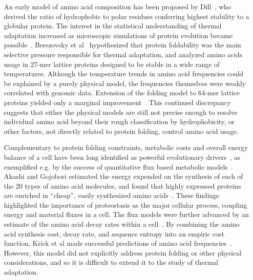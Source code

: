 \documentclass[10pt,letterpaper]{article}
\begin{document}
An early model of amino acid composition has been proposed by Dill~\cite{Dill1985Theory}, who derived the ratio of hydrophobic to polar residues conferring highest stability to a globular protein. The interest in the statistical understanding of thermal adaptation increased as microscopic simulations of protein evolution became possible~\cite{Taverna2002Why,Bloom2006Protein,Goldstein2008The}. Berezovsky et al~\cite{Berezovsky2007Positive} hypothesized that protein foldability was the main selective pressure responsible for thermal adaptation, and analyzed amino acids usage in 27-mer lattice proteins designed to be stable in a wide range of temperatures. Although the temperature trends in amino acid frequencies could be explained by a purely physical model, the frequencies themselves were weakly correlated with genomic data. Extension of the folding model to 64-mer lattice proteins yielded only a marginal improvement~\cite{Venev2015Massively}. This continued discrepancy suggests that either the physical models are still not precise enough to resolve individual amino acid  beyond their rough classification by hydrophobicity, or other factors, not directly related to protein folding, control amino acid usage.

Complementary to protein folding constraints, metabolic costs and overall energy balance of a cell have been long identified as powerful evolutionary drivers~\cite{Pal2006An}, as exemplified e.g. by the success of quantitative flux based metabolic models~\cite{Varma1994Metabolic,Price2004Genome}. Akashi and Gojobori estimated the energy expended on the synthesis of each of the 20 types of amino acid molecules, and found that highly expressed proteins are enriched in ``cheap'', easily synthesized amino acids~\cite{Akashi2002Metabolic}. These findings highlighted the importance of proteostasis as the major cellular process, coupling energy and material fluxes in a cell. The flux models were further advanced by an estimate of the amino acid decay rates within a cell~\cite{Krick2014Amino}. By combining the amino acid synthesis cost, decay rate, and sequence entropy into an empiric cost function, Krick et al made successful predictions of amino acid frequencies~\cite{Krick2014Amino}. However, this model did not explicitly address protein folding or other physical considerations, and so it is difficult to extend it to the study of thermal adaptation.
\end{document}
